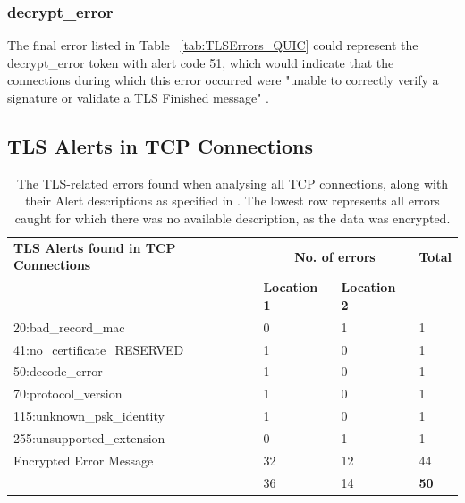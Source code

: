 \documentclass{l4proj}
\begin{document}
\subsubsection{decrypt\_error} The final error listed in Table ~\ref{tab:TLSErrors_QUIC} could represent the decrypt\_error token with alert code 51, which would indicate that the connections during which this error occurred were "unable to correctly verify a signature or validate a TLS Finished message" \citep{Resc2018}.


\subsection{TLS Alerts in TCP Connections}


\begin{table}[hbtp]
    \centering
    \caption{The TLS-related errors found when analysing all TCP connections, along with their Alert descriptions as specified in \citet{Resc2018}. The lowest row represents all errors caught for which there was no available description, as the data was encrypted.}\label{tab:TLSErrors_TCP}
    \begin{tabular}{lll|l}
    \textbf{TLS Alerts found in TCP Connections}                                & \multicolumn{2}{c|}{\textbf{No. of errors}}  & \textbf{Total} \\ 
    \textbf{}                                           & \textbf{Location 1} & \textbf{Location 2}         \\ \hline %
    20:bad\_record\_mac                   & 0                   & 1                   & 1              \\
    41:no\_certificate\_RESERVED           & 1                   & 0                   & 1              \\
    50:decode\_error                       & 1                   & 0                   & 1              \\
    70:protocol\_version                  & 1                   & 0                   & 1              \\
    115:unknown\_psk\_identity            & 1                   & 0                   & 1              \\
    255:unsupported\_extension            & 0                   & 1                   & 1              \\
    Encrypted Error Message                & 32                  & 12                  & 44             \\ \hline
                                           & 36                  & 14                  & \textbf{50}   
    \end{tabular}
\end{table}
\end{document}
